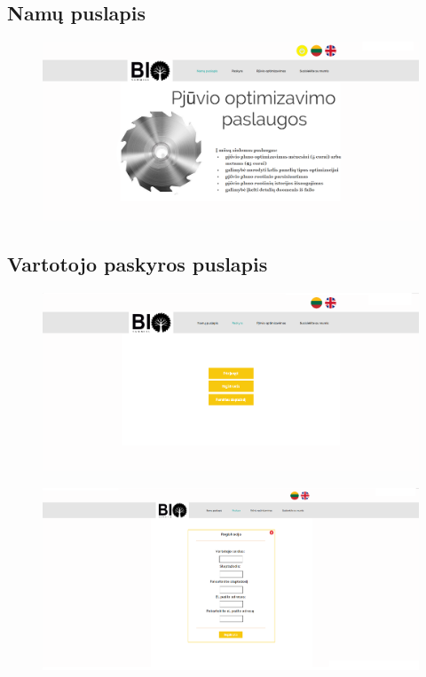 \documentclass[a4paper,12pt]{article}
\begin{document}
\subsection{Namų puslapis}
\begin{figure}[!tph]
\hspace{-2cm}
\centering
\includegraphics[scale=0.45]{interfeisai/pagrindinis}
\label{fig:verticalcell}
\end{figure}

\subsection{Vartotojo paskyros puslapis}
\begin{figure}[!tph]
\hspace{-2cm}
\centering
\includegraphics[scale=0.45]{interfeisai/paskyrosPuslapisNeprisijungta}
\label{fig:verticalcell}
\end{figure}

\begin{figure}[!tph]
\hspace{-2cm}
\centering
\includegraphics[scale=0.45]{interfeisai/paskyrosPuslapisRegistracija}
\label{fig:verticalcell}
\end{figure}
\end{document}
